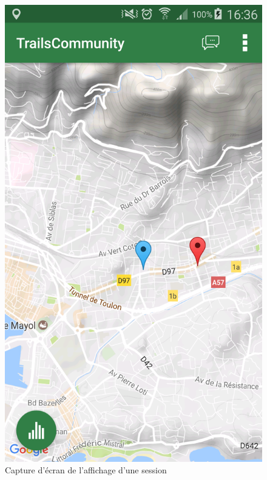 \documentclass[titlepage, 12pt]{report}
\begin{document}
\begin{figure}[!h]
	\caption{Capture d'écran de l'affichage d'une session}
	\label{screenshots_session}
	\centering
	\includegraphics[scale=0.2]{Images/screenshots/session.png}
\end{figure}

\clearpage
\end{document}
